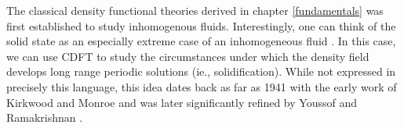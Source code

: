 The classical density functional theories derived in chapter \ref{fundamentals} was first established to study inhomogenous fluids.
Interestingly, one can think of the solid state as an especially extreme case of an inhomogeneous fluid \cite{HANSEN-CH6}.
In this case, we can use CDFT to study the circumstances under which the density field develops long range periodic solutions (ie., solidification).
While not expressed in precisely this language, this idea dates back as far as 1941 with the early work of Kirkwood and Monroe \cite{KIRKWOOD_MONROE41} and was later significantly refined by Youssof and Ramakrishnan \cite{RAMAKRISHNAN79}.